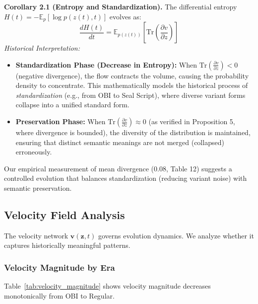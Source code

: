 \documentclass{article}
\begin{document}
\textbf{Corollary 2.1 (Entropy and Standardization).}
The differential entropy $H(t) = -\mathbb{E}_{p}[\log p(z(t), t)]$ evolves as:
\begin{equation}
    \frac{d H(t)}{d t} = \mathbb{E}_{p(z(t))}\left[\text{Tr}\left(\frac{\partial v}{\partial z}\right)\right]
\end{equation}
\textit{Historical Interpretation:}
\begin{itemize}
    \item \textbf{Standardization Phase (Decrease in Entropy):} When $\text{Tr}(\frac{\partial v}{\partial z}) < 0$ (negative divergence), the flow contracts the volume, causing the probability density to concentrate. This mathematically models the historical process of \textit{standardization} (e.g., from OBI to Seal Script), where diverse variant forms collapse into a unified standard form.
    \item \textbf{Preservation Phase:} When $\text{Tr}(\frac{\partial v}{\partial z}) \approx 0$ (as verified in Proposition 5, where divergence is bounded), the diversity of the distribution is maintained, ensuring that distinct semantic meanings are not merged (collapsed) erroneously.
\end{itemize}
Our empirical measurement of mean divergence ($0.08$, Table 12) suggests a controlled evolution that balances standardization (reducing variant noise) with semantic preservation.







\subsection{Velocity Field Analysis}

The velocity network $\mathbf{v}(\mathbf{z}, t)$ governs evolution dynamics. We analyze whether it captures historically meaningful patterns.

\subsubsection{Velocity Magnitude by Era}

Table~\ref{tab:velocity_magnitude} shows velocity magnitude decreases monotonically from OBI to Regular.
\end{document}
